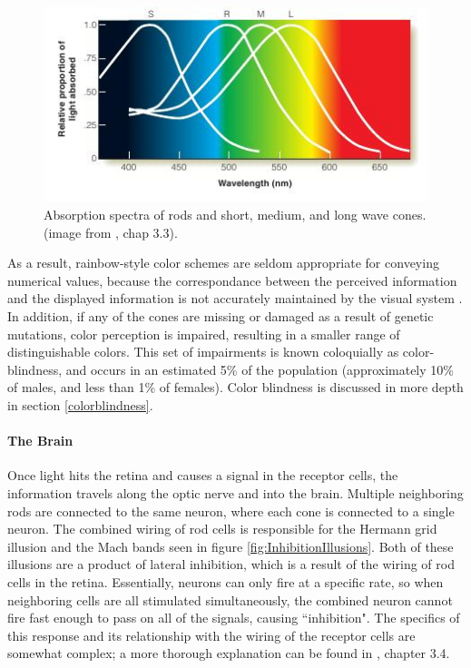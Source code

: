 \documentclass[11pt]{isuthesis}\usepackage[]{graphicx}\usepackage[]{color}
\begin{document}
\begin{figure}[htbp]\centering
\includegraphics[width=.6\textwidth, keepaspectratio=TRUE]{AbsorptionSpectra}
\caption[Absorption spectra of retinal cells]{Absorption spectra of rods and short, medium, and long wave cones. (image from \protect\citealt{goldstein}, chap 3.3).} \label{fig:ColorRange}
\end{figure}

As a result, rainbow-style color schemes are seldom appropriate for conveying numerical values, because the correspondance between the perceived information and the displayed information is not accurately maintained by the visual system \citep{rainbowcolor}. In addition, if any of the cones are missing or damaged as a result of genetic mutations, color perception is impaired, resulting in a smaller range of distinguishable colors. This set of impairments is known coloquially as color-blindness, and occurs in an estimated 5\% of the population (approximately 10\% of males, and less than 1\% of females). Color blindness is discussed in more depth in section \ref{colorblindness}. 

\paragraph{The Brain}
Once light hits the retina and causes a signal in the receptor cells, the information travels along the optic nerve and into the brain. Multiple neighboring rods are connected to the same neuron, where each cone is connected to a single neuron. The combined wiring of rod cells is responsible for the Hermann grid illusion and the Mach bands seen in figure \ref{fig:InhibitionIllusions}. Both of these illusions are a product of lateral inhibition, which is a result of the wiring of rod cells in the retina. Essentially, neurons can only fire at a specific rate, so when neighboring cells are all stimulated simultaneously, the combined neuron cannot fire fast enough to pass on all of the signals, causing ``inhibition". The specifics of this response and its relationship with the wiring of the receptor cells are somewhat complex; a more thorough explanation can be found in \citet{goldstein}, chapter 3.4. 
\end{document}

